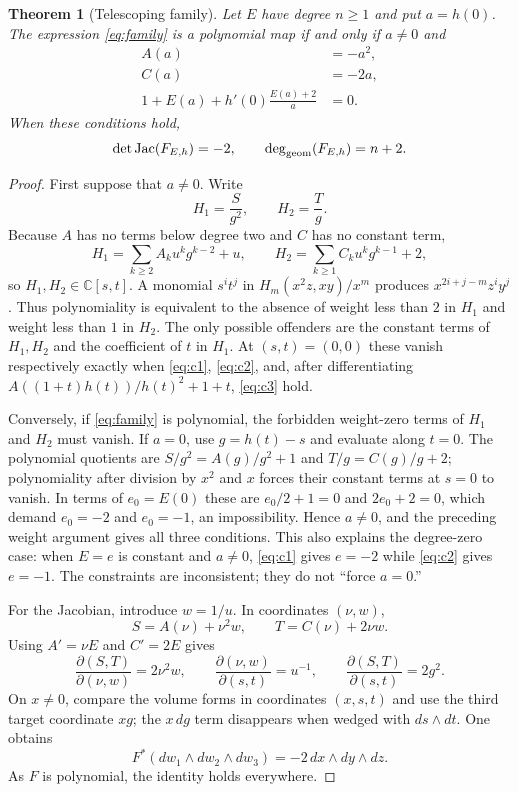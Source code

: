 \documentclass[11pt]{amsart}
\newtheorem{theorem}{Theorem}[section]
\theoremstyle{remark}
\newcommand{\C}{\mathbb C}
\newcommand{\Jac}{\operatorname{Jac}}
\begin{document}
\begin{theorem}[Telescoping family]\label{thm:family}
Let $E$ have degree $n\ge1$ and put $a=h(0)$.  The expression \eqref{eq:family} is a polynomial map if and only if $a\ne0$ and
\begin{align}
 A(a)&=-a^2, \label{eq:c1}\\
 C(a)&=-2a, \label{eq:c2}\\
 1+E(a)+h'(0)\frac{E(a)+2}{a}&=0. \label{eq:c3}
\end{align}
When these conditions hold,
\[
 \det\Jac(F_{E,h})=-2,
 \qquad \deg_{\rm geom}(F_{E,h})=n+2.
\]
\end{theorem}

\begin{proof}
First suppose that $a\ne0$.  Write
\[
 H_1=\frac{S}{g^2},\qquad H_2=\frac{T}{g}.
\]
Because $A$ has no terms below degree two and $C$ has no constant term,
\[
 H_1=\sum_{k\ge2}A_k u^kg^{k-2}+u,
 \qquad H_2=\sum_{k\ge1}C_k u^kg^{k-1}+2,
\]
so $H_1,H_2\in\C[s,t]$.  A monomial $s^it^j$ in
$H_m(x^2z,xy)/x^m$ produces $x^{2i+j-m}z^iy^j$.  Thus polynomiality is equivalent to the absence of weight less than $2$ in $H_1$ and weight less than $1$ in $H_2$.  The only possible offenders are the constant terms of $H_1,H_2$ and the coefficient of $t$ in $H_1$.  At $(s,t)=(0,0)$ these vanish respectively exactly when \eqref{eq:c1}, \eqref{eq:c2}, and, after differentiating $A((1+t)h(t))/h(t)^2+1+t$, \eqref{eq:c3} hold.

Conversely, if \eqref{eq:family} is polynomial, the forbidden weight-zero terms of $H_1$ and $H_2$ must vanish.  If $a=0$, use $g=h(t)-s$ and evaluate along $t=0$.  The polynomial quotients are $S/g^2=A(g)/g^2+1$ and $T/g=C(g)/g+2$; polynomiality after division by $x^2$ and $x$ forces their constant terms at $s=0$ to vanish.  In terms of $e_0=E(0)$ these are $e_0/2+1=0$ and $2e_0+2=0$, which demand $e_0=-2$ and $e_0=-1$, an impossibility.  Hence $a\ne0$, and the preceding weight argument gives all three conditions.  This also explains the degree-zero case: when $E=e$ is constant and $a\ne0$, \eqref{eq:c1} gives $e=-2$ while \eqref{eq:c2} gives $e=-1$.  The constraints are inconsistent; they do not ``force $a=0$.''

For the Jacobian, introduce $w=1/u$.  In coordinates $(\nu,w)$,
\[
 S=A(\nu)+\nu^2w,
 \qquad T=C(\nu)+2\nu w.
\]
Using $A'=\nu E$ and $C'=2E$ gives
\[
 \frac{\partial(S,T)}{\partial(\nu,w)}=2\nu^2w,
 \qquad
 \frac{\partial(\nu,w)}{\partial(s,t)}=u^{-1},
 \qquad
 \frac{\partial(S,T)}{\partial(s,t)}=2g^2.
\]
On $x\ne0$, compare the volume forms in coordinates $(x,s,t)$ and use the third target coordinate $xg$; the $x\,dg$ term disappears when wedged with $ds\wedge dt$.  One obtains
\[
 F^*(dw_1\wedge dw_2\wedge dw_3)=-2\,dx\wedge dy\wedge dz.
\]
As $F$ is polynomial, the identity holds everywhere.


\end{proof}
\end{document}
